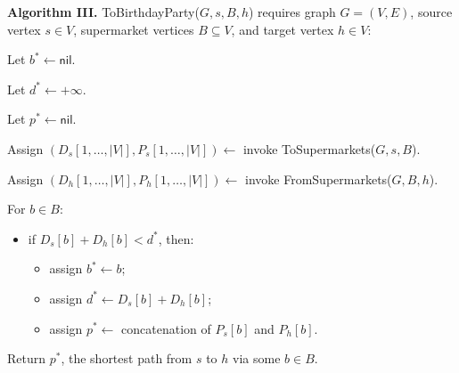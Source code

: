 \begin{enumerate}
\begin{solution}
\textbf{Algorithm III. }{\sc ToBirthdayParty}($G,s,B,h$) requires graph $G=(V,E)$, source vertex $s\in V$, supermarket vertices $B\subseteq V$, and target vertex $h\in V$:

Let $b^*\leftarrow\mathsf{nil}$.

Let $d^*\leftarrow+\infty$.

Let $p^*\leftarrow\mathsf{nil}$.

Assign $(D_s[1,\dots,|V|],P_s[1,\dots,|V|])\leftarrow $ invoke {\sc ToSupermarkets}($G,s,B$).

Assign $(D_h[1,\dots,|V|],P_h[1,\dots,|V|])\leftarrow $ invoke {\sc FromSupermarkets}($G,B,h$).

For $b\in B$:
\begin{itemize}
\item if $D_s[b]+D_h[b]<d^*$, then:
\begin{itemize}
\item assign $b^*\leftarrow b$;
\item assign $d^*\leftarrow D_s[b]+D_h[b]$;
\item assign $p^*\leftarrow $ concatenation of $P_s[b]$ and $P_h[b]$.
\end{itemize}
\end{itemize}
Return $p^*$, the shortest path from $s$ to $h$ via some $b\in B$.
\end{solution}
\end{enumerate}
\newpage

